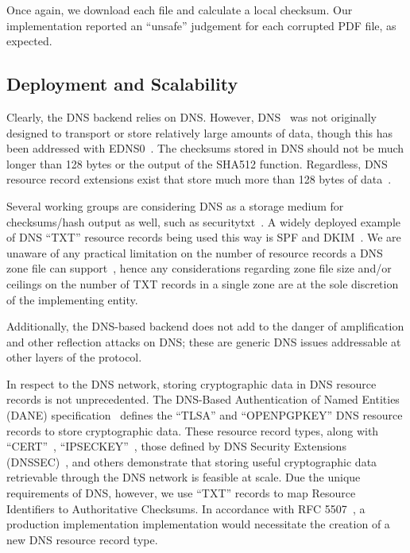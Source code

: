 Once again, we download each file and calculate a local checksum. Our
implementation reported an ``unsafe'' judgement for each corrupted PDF file, as
expected.


\subsection{Deployment and Scalability}


Clearly, the DNS backend relies on DNS. However, DNS~\cite{DNS1} was not
originally designed to transport or store relatively large amounts of data,
though this has been addressed with EDNS0~\cite{EDNS}. The checksums stored in
DNS should not be much longer than 128 bytes or the output of the SHA512
function. Regardless, DNS resource record extensions exist that store much more
than 128 bytes of data~\cite{CERT, IPSECKEY, DANE3, DANE1}.

Several working groups are considering DNS as a storage medium for
checksums/hash output as well, such as securitytxt~\cite{draft-sectxt}. A widely
deployed example of DNS ``TXT'' resource records being used this way is SPF and
DKIM~\cite{DKIM}. We are unaware of any practical limitation on the number of
resource records a DNS zone file can support~\cite{DNS1}, hence any
considerations regarding zone file size and/or ceilings on the number of TXT
records in a single zone are at the sole discretion of the implementing entity.

Additionally, the DNS-based backend does not add to the danger of amplification
and other reflection attacks on DNS; these are generic DNS issues addressable at
other layers of the protocol.

In respect to the DNS network, storing cryptographic data in DNS resource
records is not unprecedented. The DNS-Based Authentication of Named Entities
(DANE) specification~\cite{DANE1, DANE2, DANE3} defines the ``TLSA'' and
``OPENPGPKEY'' DNS resource records to store cryptographic data. These resource
record types, along with ``CERT''~\cite{CERT}, ``IPSECKEY''~\cite{IPSECKEY},
those defined by DNS Security Extensions (DNSSEC)~\cite{DNSSEC}, and others
demonstrate that storing useful cryptographic data retrievable through the DNS
network is feasible at scale. Due the unique requirements of DNS, however, we
use ``TXT'' records to map Resource Identifiers to Authoritative Checksums. In
accordance with RFC 5507~\cite{RFC5507}, a production implementation
implementation would necessitate the creation of a new DNS resource record type.

